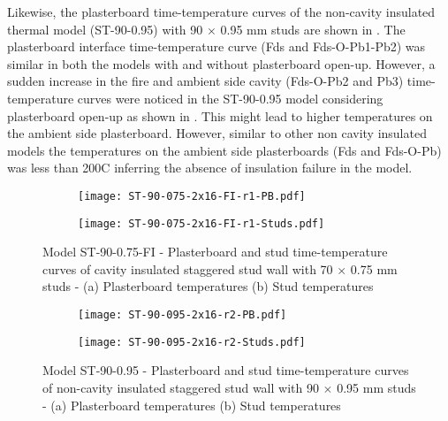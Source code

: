 Likewise, the plasterboard time-temperature curves of the non-cavity insulated thermal model (ST-90-0.95) with 90 $\times$ 0.95 mm studs are shown in . The plasterboard interface time-temperature curve (Fds and Fds-O-Pb1-Pb2) was similar in both the models with and without plasterboard open-up. However, a sudden increase in the fire and ambient side cavity (Fds-O-Pb2 and Pb3) time-temperature curves were noticed in the ST-90-0.95 model considering plasterboard open-up as shown in . This might lead to higher temperatures on the ambient side plasterboard. However, similar to other non cavity insulated models the temperatures on the ambient side plasterboards (Fds and Fds-O-Pb) was less than 200\degree C inferring the absence of insulation failure in the model.  
\begin{figure}[!htbp]
	\centering
	\begin{subfigure}[b]{0.6\textwidth}
		\centering
		\texttt{[image: ST-90-075-2x16-FI-r1-PB.pdf]}
		\caption{}
		\label{subfig:ST-90-075-2x16-FI-r1-PB}
	\end{subfigure}
	\begin{subfigure}[b]{0.6\textwidth}
		\centering
		\texttt{[image: ST-90-075-2x16-FI-r1-Studs.pdf]}
		\caption{}
		\label{subfig:ST-90-075-2x16-FI-r1-Studs}
	\end{subfigure}
	   \caption{Model ST-90-0.75-FI - Plasterboard and stud time-temperature curves of cavity insulated staggered stud wall with 70 $\times$ 0.75 mm studs - (a) Plasterboard temperatures (b) Stud temperatures}
	   \label{fig:ST-90-075-2x16-FI-r1}
\end{figure}
\begin{figure}[!htbp]
	\centering
	\begin{subfigure}[b]{0.6\textwidth}
		\centering
		\texttt{[image: ST-90-095-2x16-r2-PB.pdf]}
		\caption{}
		\label{subfig:ST-90-095-2x16-r2-PB}
	\end{subfigure}
	\begin{subfigure}[b]{0.6\textwidth}
		\centering
		\texttt{[image: ST-90-095-2x16-r2-Studs.pdf]}
		\caption{}
		\label{subfig:ST-90-095-2x16-r2-Studs}
	\end{subfigure}
	   \caption{Model ST-90-0.95 - Plasterboard and stud time-temperature curves of non-cavity insulated staggered stud wall with 90 $\times$ 0.95 mm studs - (a) Plasterboard temperatures (b) Stud temperatures}
	   \label{fig:ST-90-095-2x16-r2}
\end{figure}


